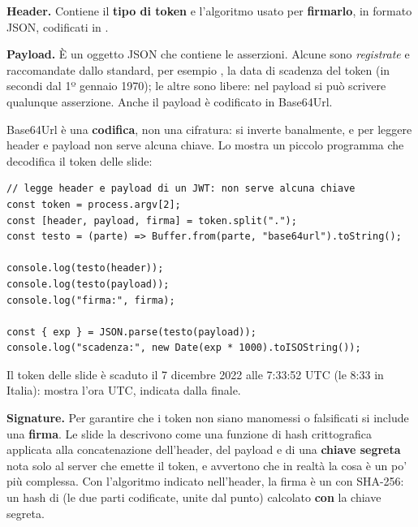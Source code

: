 \textbf{Header.} Contiene il \textbf{tipo di token} e l'algoritmo usato per
\textbf{firmarlo}, in formato JSON, codificati in .

\textbf{Payload.} È un oggetto JSON che contiene le asserzioni. Alcune sono
\textit{registrate} e raccomandate dallo standard, per esempio , la
data di scadenza del token (in secondi dal 1º gennaio 1970); le altre sono
libere: nel payload si può scrivere qualunque asserzione. Anche il payload è
codificato in Base64Url.

Base64Url è una \textbf{codifica}, non una cifratura: si inverte banalmente, e
per leggere header e payload non serve alcuna chiave. Lo mostra un piccolo
programma che decodifica il token delle slide:

\begin{lstlisting}[style=js, name=decodifica.js]
// legge header e payload di un JWT: non serve alcuna chiave
const token = process.argv[2];
const [header, payload, firma] = token.split(".");
const testo = (parte) => Buffer.from(parte, "base64url").toString();

console.log(testo(header));
console.log(testo(payload));
console.log("firma:", firma);

const { exp } = JSON.parse(testo(payload));
console.log("scadenza:", new Date(exp * 1000).toISOString());
\end{lstlisting}


Il token delle slide è scaduto il 7 dicembre 2022 alle 7:33:52 UTC (le 8:33 in
Italia):  mostra l'ora UTC, indicata dalla  finale.


\textbf{Signature.} Per garantire che i token non siano manomessi o falsificati
si include una \textbf{firma}. Le slide la descrivono come una funzione di hash
crittografica applicata alla concatenazione dell'header, del payload e di una
\textbf{chiave segreta} nota solo al server che emette il token, e avvertono
che in realtà la cosa è un po' più complessa. Con l'algoritmo 
indicato nell'header, la firma è un  con SHA-256: un hash di
 (le due parti codificate, unite dal punto) calcolato
\textbf{con} la chiave segreta.

